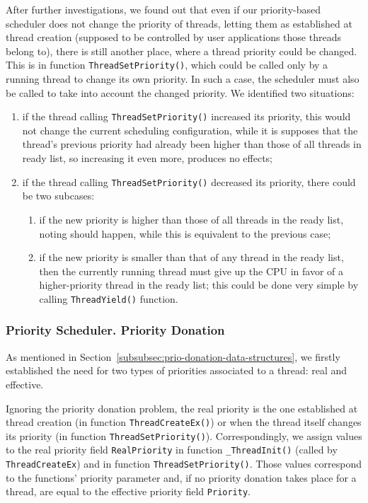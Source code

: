 After further investigations, we found out that even if our priority-based scheduler does not change the priority of threads, letting them as established at thread creation (supposed to be controlled by user applications those threads belong to), there is still another place, where a thread priority could be changed. This is in function \lstinline|ThreadSetPriority()|, which could be called only by a running thread to change its own priority. In such a case, the scheduler must also be called to take into account the changed priority. We identified two situations:
\begin{enumerate}
    \item if the thread calling \lstinline|ThreadSetPriority()| increased its priority, this would not change the current scheduling configuration, while it is supposes that the thread's previous priority had already been higher than those of all threads in ready list, so increasing it even more, produces no effects;
    
    \item if the thread calling \lstinline|ThreadSetPriority()| decreased its priority, there could be two subcases:
        \begin{enumerate}
            \item if the new priority is higher than those of all threads in the ready list, noting should happen, while this is equivalent to the previous case;
            
            \item if the new priority is smaller than that of any thread in the ready list, then the currently running thread must give up the CPU in favor of a higher-priority thread in the ready list; this could be done very simple by calling \lstinline|ThreadYield()| function.
        \end{enumerate}

\end{enumerate}


\subsubsection{Priority Scheduler. Priority Donation}
\label{subsubsec:prio-donation-analysis-and-design}

As mentioned in Section~\ref{subsubsec:prio-donation-data-structures}, we firstly established the need for two types of priorities associated to a thread: real and effective. 

Ignoring the priority donation problem, the real priority is the one established at thread creation (in function \lstinline|ThreadCreateEx()|) or when the thread itself changes its priority (in function \lstinline|ThreadSetPriority()|). Correspondingly, we assign values to the real priority field \lstinline|RealPriority| in function \lstinline|_ThreadInit()| (called by \lstinline|ThreadCreateEx|) and in function \lstinline|ThreadSetPriority()|. Those values correspond to the functions' priority parameter and, if no priority donation takes place for a thread, are equal to the effective priority field \lstinline|Priority|.

